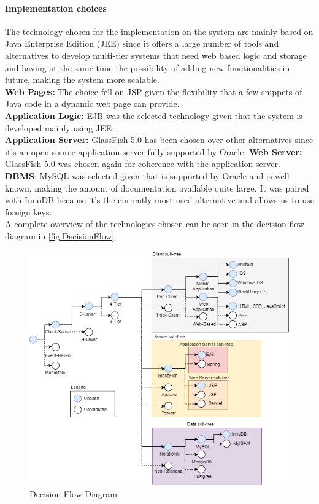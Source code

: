 \paragraph*{Implementation choices\\}
The technology chosen for the implementation on the system are mainly based on Java Enterprise Edition (JEE) since it offers a large number of tools and alternatives to develop multi-tier systems that need web based logic and storage and having at the same time the possibility of adding new functionalities in future, making the system more scalable.\\
\textbf{Web Pages:} The choice fell on JSP given the flexibility that a few snippets of Java code in a dynamic web page can provide.\\
\textbf{Application Logic:} EJB was the selected technology given that the system is developed mainly using JEE.\\
\textbf{Application Server:} GlassFish 5.0 has been chosen over other alternatives since it's an open source application server fully supported by Oracle.
\textbf{Web Server:} GlassFish 5.0 was chosen again for coherence with the application server.\\
\textbf{DBMS}: MySQL was selected given that is supported by Oracle and is well known, making the amount of documentation available quite large. It was paired with InnoDB because it's the currently most used alternative and allows us to use foreign keys.\\

A complete overview of the technologies chosen can be seen in the decision flow diagram in \autoref{fig:DecisionFlow}
\begin{figure}
\includegraphics[width = \textwidth, keepaspectratio = true]{Img/DecisionFlow}
	\caption{Decision Flow Diagram}
	\label{fig:DecisionFlow}
\end{figure}
\newpage

